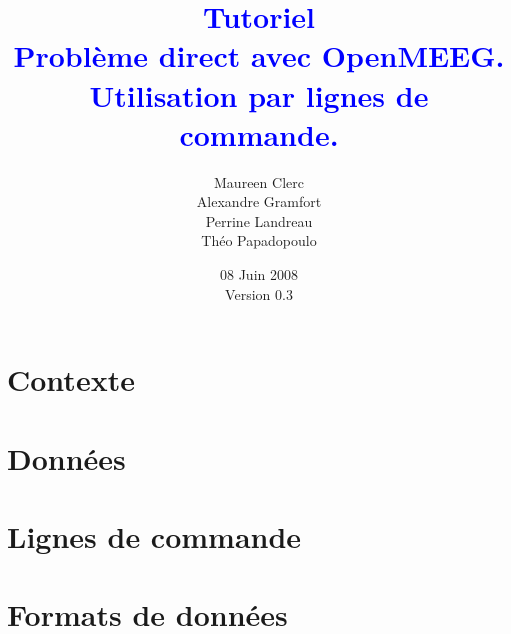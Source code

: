 \documentclass[11pt,a4paper,makeidx]{book}
\title{{\textbf{\textcolor{blue}{Tutoriel\\
        {\Large Problème direct avec OpenMEEG.\\
                Utilisation par lignes de commande.}}}}}
\author{Maureen Clerc\\Alexandre Gramfort \\
        Perrine Landreau\\Théo Papadopoulo}
\date{08 Juin 2008\\
      Version 0.3}
\begin{document}
    \maketitle
    \tableofcontents

    \chapter{Contexte}
    

    \chapter{Données}
    

    \chapter{Lignes de commande}
    

    \appendix
    \chapter{Formats de données}
	\label{chap:formats}
    
\end{document}
